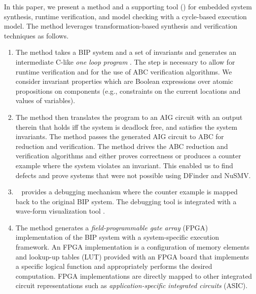 In this paper, we present a method and a supporting tool (\biptool)
for embedded system synthesis, runtime verification,
and model checking with a cycle-based execution model.
The method leverages transformation-based synthesis and verification techniques 
as follows. 
%
\begin{enumerate}
\item The method takes a BIP system and a set of invariants and generates 
  an intermediate C-like {\em one loop program } \caig. 
  The \caig step is necessary to allow for runtime verification and for the use
  of ABC verification algorithms. We consider invariant properties which are Boolean expressions
over atomic propositions on components (e.g., constraints on the current locations and values of variables).

\item The method then translates the \caig program to 
  an AIG circuit with an output therein that holds iff the system 
  is deadlock free, and satisfies the system invariants. 
  The method passes the generated AIG circuit to ABC for reduction and 
  verification. 
  The method drives the ABC reduction and verification algorithms and 
  either proves correctness or produces a counter example where the 
  system violates an invariant. 
  This enabled us to find defects and prove systems that were not 
  possible using DFinder and NuSMV. 

\item  \biptool~ provides a debugging mechanism where the 
  counter example is mapped back to the original BIP system. 
  The debugging tool is integrated with a wave-form visualization tool 
  \cite{bybell2010gtkwave}.  
\item The method generates a {\em field-programmable gate array} (FPGA) 
  implementation of the BIP system with a 
  system-specific execution framework. 
  An FPGA implementation is a configuration of 
  memory elements and lookup-up tables (LUT) provided with an FPGA board
  that implements a specific logical function
  and appropriately performs the desired computation. 
  FPGA implementations are directly mapped to other integrated circuit representations
  such as {\em application-specific integrated circuits} (ASIC). 


\end{enumerate}
